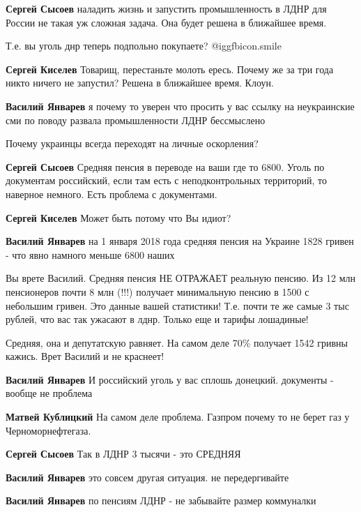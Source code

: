 \begin{itemize}
\begin{itemize}
\textbf{Сергей Сысоев} наладить жизнь и запустить промышленность в ЛДНР для России не такая уж сложная задача. Она будет решена в ближайшее время.

Т.е. вы уголь днр теперь подпольно покупаете?
 @igg{fbicon.smile} 

\textbf{Сергей Киселев} Товарищ, перестаньте молоть ересь. Почему же за три года никто ничего не запустил? Решена в ближайшее время. Клоун.

\textbf{Василий Январев} я почему то уверен что просить у вас ссылку на неукраинские сми по поводу развала промышленности ЛДНР бессмыслено

Почему украинцы всегда переходят на личные оскорления?

\textbf{Сергей Сысоев} Средняя пенсия в переводе на ваши где то 6800. Уголь по документам российский, если там есть с неподконтрольных территорий, то наверное немного. Есть проблема с документами.

\textbf{Сергей Киселев} Может быть потому что Вы идиот?

\textbf{Василий Январев} на 1 января 2018 года средняя пенсия на Украине 1828 гривен - что явно намного меньше 6800 наших

Вы врете Василий.
Средняя пенсия НЕ ОТРАЖАЕТ реальную пенсию.
Из 12 млн пенсионеров почти 8 млн (!!!) получает минимальную пенсию в 1500 с небольшим гривен.
Это данные вашей статистики!
Т.е. почти те же самые 3 тыс рублей, что вас так ужасают в лднр.
Только еще и тарифы лошадиные!

Средняя, она и депутатскую равняет.
На самом деле 70\% получает 1542 гривны кажись.
Врет Василий и не краснеет!

\textbf{Василий Январев} И российский уголь у вас сплошь донецкий. документы - вообще не проблема

\textbf{Матвей Кублицкий} На самом деле проблема. Газпром почему то не берет газ у Черноморнефтегаза.

\textbf{Сергей Сысоев} Так в ЛДНР 3 тысячи - это СРЕДНЯЯ

\textbf{Василий Январев} это совсем другая ситуация. не передергивайте

\textbf{Василий Январев} по пенсиям ЛДНР - не забывайте размер коммуналки


\end{itemize}
\end{itemize}
